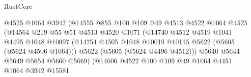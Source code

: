 \begin{lexlean}{RustCore}
\begin{coremodule}
                                        @4525
                                        @1064
                                        @3942
                                        (@14555
                                          @855
                                          @100
                                          @109
                                          @49
                                          @4513
                                          @4522
                                          @1064
                                          @4525
                                          (@14564
                                            @219
                                            @55
                                            @51
                                            @4513
                                            @4520
                                            @1071
                                            (@14740
                                              @4512
                                              @4519
                                              @1041
                                              @4495
                                              @1048
                                              @10097
                                              (@14754
                                                @4505
                                                @1048
                                                @10019
                                                @10115
                                                @5622
                                                (@5605 (@5624 @4506 @1064)))
                                              @5622
                                              (@5605 (@5624 @4496 @4512)))
                                            @5640
                                            @5644
                                            @5649
                                            @5654
                                            @5660
                                            @5669)
                                          (@14606
                                            @4522
                                            @100
                                            @109
                                            @49
                                            @1064
                                            @4451
                                            @1064
                                            @3942
                                            @15581

\end{coremodule}
\end{lexlean}
